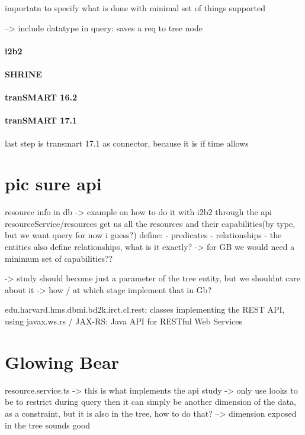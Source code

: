 importatn to specify what is done with minimal set of things supported

--> include datatype in query: saves a req to tree node
\paragraph{i2b2}

\paragraph{SHRINE}

\paragraph{tranSMART 16.2}

\paragraph{tranSMART 17.1}
last step is transmart 17.1 as connector, because it is if time allows



\section{pic sure api}
resource info in db -> example on how to do it with i2b2
through the api resourceService/resources get us all the resources and their capabilities(by type, but we want query for now i guess?)
define:
- predicates
- relationships
- the entities also define relationships, what is it exactly?
-> for GB we would need a minimum set of capabilities??

-> study should become just a parameter of the tree entity, but we shouldnt care about it
 -> how / at which stage implement that in Gb?

 edu.harvard.hms.dbmi.bd2k.irct.cl.rest;
 classes implementing the REST API, using javax.ws.rs / JAX-RS: Java API for RESTful Web Services
 


\section{Glowing Bear}
resource.service.ts -> this is what implements the api
study -> only use looks to be to restrict during query
then it can simply be another dimension of the data, as a constraint, but it is also in the tree, how to do that?
--> dimension exposed in the tree sounds good

